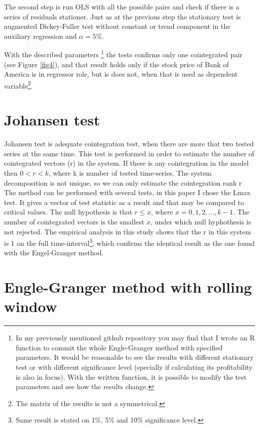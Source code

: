 \documentclass[12pt, a4paper, twoside, titlepage]{article}
\begin{document}
The second step is run OLS with all the possible pairs and check if there is a series of residuals stationer. Just as at the previous step the stationary test is augmented Dickey-Fuller test without constant or trend component in the auxiliary regression and $\alpha = 5\%$.

With the described parameters \footnote{In my previously mentioned github repository you may find that I wrote an R function to commit the whole Engle-Granger method with specified parameters. It would be reasonable to see the results with different stationary test or with different significance level (specially if calculating its profitability is also in focus). With the written function, it is possible to modify the test parameters and see how the results change.} the tests confirms only one cointegrated pair (see Figure \ref{fig4}), and that result holds only if the stock price of Bank of America is in regressor role, but is does not, when that is used as dependent variable\footnote{The matrix of the results is not a symmetrical.}.

\section*{Johansen test}

Johansen test is adequate cointegration test, when there are more that two tested series at the same time. This test is performed in order to estimate the number of cointegrated vectors (r) in the system. If there is any cointegration in the model then $0<r<k$, where k is number of tested time-series. The system decomposition is not unique, so we can only estimate the cointegration rank r %
The method can be performed with several tests, in this paper I chose the Lmax test. It gives a vector of test statistic as a result and that may be compared to critical values. The null hypothesis is that $r \leq x$, where $x = 0, 1, 2, ..., k-1$. The number of cointegrated vectors is the smallest $x$, under which null hyphothesis is not rejected. The empirical analysis in this study shows that the r in this system is 1 on the full time-interval\footnote{Same result is stated on 1\%, 5\% and 10\% significance level.}, which confirms the identical result as the one found with the Engel-Granger method.

\section*{Engle-Granger method with rolling window}
\end{document}
